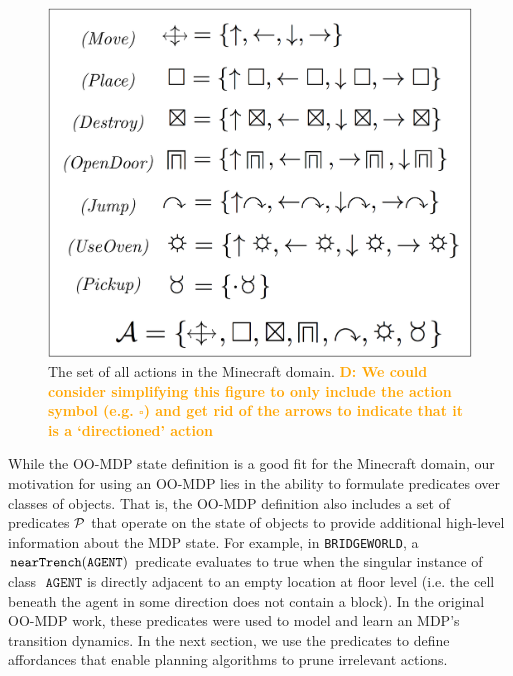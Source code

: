 \documentclass[]{article}
\newcommand{\dnote}[1]{\textcolor{Orange}{\textbf{D: #1}}}
\begin{document}
\begin{figure}
\centering
\includegraphics[scale = 0.15]{figures/all_actions.png}
\caption{The set of all actions in the Minecraft domain. \label{fig:all_actions} \dnote{We could consider simplifying this figure to only include the action symbol (e.g. $\square$) and get rid of the arrows to indicate that it is a `directioned' action}}
\end{figure}

While the OO-MDP state definition is a good fit for the Minecraft
domain, our motivation for using an OO-MDP lies in the ability to
formulate predicates over classes of objects. That is, the OO-MDP
definition also includes a set of predicates ${\cal P}$ that operate
on the state of objects to provide additional high-level information
about the MDP state. For example, in \texttt{BRIDGEWORLD}, a ${\tt
  nearTrench}({\tt AGENT})$ predicate evaluates to true when the singular
instance of class $\texttt{ AGENT}$ is directly adjacent to an empty location
at floor level (i.e. the cell beneath the agent in some direction does not
contain a block). In the original OO-MDP work, these predicates were used
to model and learn an MDP's transition dynamics. In the next section,
we use the predicates to define affordances that enable planning
algorithms to prune irrelevant actions.



\end{document}
